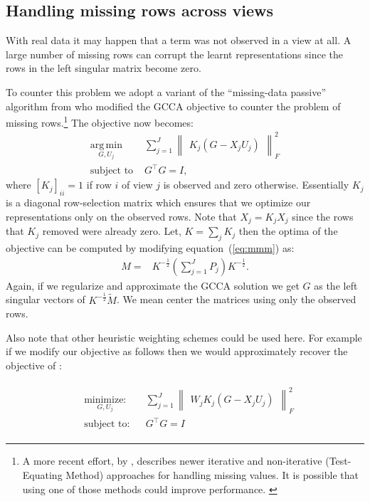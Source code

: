 \documentclass[11pt]{article}
\newcommand{\minimize}[3]{
\begin{aligned}
& \underset{#1}{\textrm{minimize:}}
& & #2 \\
& \textrm{subject to:}
& &  #3
\end{aligned}
}
\newcommand{\remove}[1]{}
\begin{document}
\subsection{Handling missing rows across views}
\label{ssec:missing}
With real data it may happen that a term was not observed in a view at
all. A large number of
missing rows can corrupt the learnt representations since the rows
in the left singular matrix become zero.
\remove{The procedure described above
can not recover from this and the representation for those words may become a
one hot vector. }
To counter this problem we adopt a variant of the ``missing-data
passive'' algorithm from  who modified the
GCCA objective to counter the problem of missing
rows.\footnote{A more recent effort, by ,
  describes newer iterative and non-iterative (Test-Equating Method)
  approaches for handling missing values. It is possible that using
  one of those methods could improve performance. \label{ftn:mis}}
The objective now becomes:
\begin{equation}
  \label{eq:gcca2}
\begin{split}
  \operatorname*{arg\,min}_{G,U_j} & \sum_{j=1}^J \begin{Vmatrix} K_j(G - X_jU_j) \end{Vmatrix}^2_F \\
  \text{subject to } & G^\top G = I,
\end{split}
\end{equation}
where $[K_j]_{ii} = 1$ if row $i$ of view $j$ is observed and zero otherwise. Essentially $K_j$ is a diagonal row-selection matrix which ensures
that we optimize our representations only on the observed rows. Note that
$X_j = K_jX_j$ since the rows that $K_j$ removed were already
zero. Let, $K =
\sum_j K_j$ then the optima
of the objective can be computed by modifying equation~(\ref{eq:mmm}) as:
\begin{align}
  M =& K^{-\frac{1}{2}}(\sum_{j=1}^J P_j)K^{-\frac{1}{2}}.
\end{align}
Again, if we regularize and approximate the GCCA solution we get
$G$ as the left singular vectors of $K^{-\frac{1}{2}}\tilde{M}$. We mean center the matrices using only the observed rows.

Also note that other heuristic weighting schemes could be used
here. For example if we modify our objective as follows then we would
approximately recover the objective of :

\begin{eqnarray}
  \label{eq:gcca3}
\minimize{G,U_j}{\sum_{j=1}^J \begin{Vmatrix} W_j K_j(G - X_jU_j) \end{Vmatrix}^2_F}{G^\top G = I }
\end{eqnarray}
\end{document}
